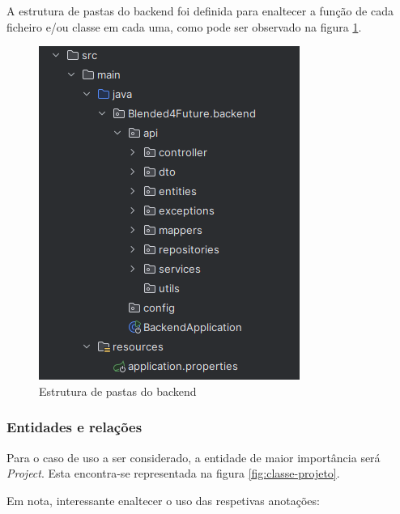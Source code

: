 A estrutura de pastas do backend foi definida para enaltecer a função de cada ficheiro e/ou classe em cada uma, como pode ser observado na figura \ref{fig:folder-struct-backend}.

\begin{figure}
    \centering
    \includegraphics[width=0.5\linewidth]{capitulos/cap4-implementacao/assets/fold-struct-backend.png}
    \caption{Estrutura de pastas do backend}
    \label{fig:folder-struct-backend}
\end{figure}

\subsubsection{Entidades e relações}

Para o caso de uso a ser considerado, a entidade de maior importância será \textit{Project}. Esta encontra-se representada na figura \ref{fig:classe-projeto}.

Em nota, interessante enaltecer o uso das respetivas anotações:

